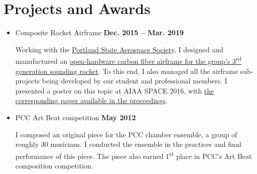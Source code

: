 \documentclass[letterpaper]{article}
\begin{document}
\section{Projects and Awards}
\begin{center}
\begin{itemize}
\item Composite Rocket Airframe
	\hfill\textbf{Dec. 2015 -- Mar. 2019} %
	\par Working with the \href{http://psas.pdx.edu/}{Portland State Aerospace Society}, I designed and manufactured an \href{https://github.com/psas/sw-cad-airframe-lv3.0}{open-hardware carbon fiber airframe for the group's 3\textsuperscript{rd} generation sounding rocket}. 
	To this end, I also managed all the airframe sub-projects being developed by our student and professional members. 
	I presented a poster on this topic at AIAA SPACE 2016, with \href{http://arc.aiaa.org/doi/pdf/10.2514/6.2016-5365}{the corresponding paper available in the proceedings}. 
\item PCC Art Beat competition \hfill\textbf{May 2012}
	\par I composed an original piece for the PCC chamber ensemble, a group of roughly 30 musicians. 
	I conducted the ensemble in the practices and final performance of this piece.
	The piece also earned 1\textsuperscript{st} place in PCC's Art Beat composition competition. 
\end{itemize}
\end{center}

\filbreak
\end{document}
